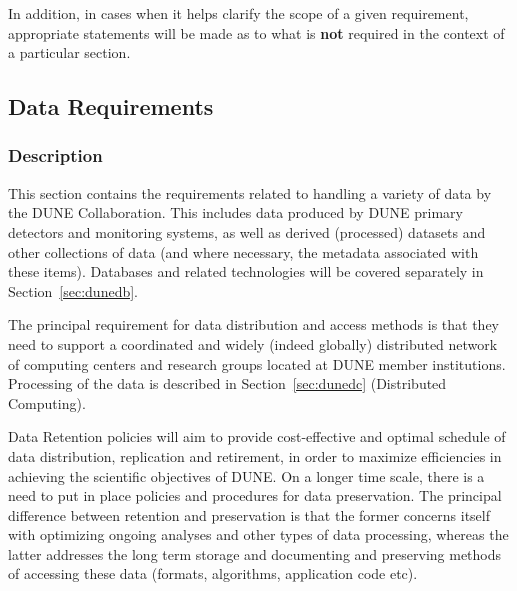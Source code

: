 In addition, in cases when it helps clarify the scope of a given  requirement, appropriate statements will be made as to what is \textbf{not} required in the context of a particular section.


\subsection{Data Requirements}
\label{sec:dunedata}

\subsubsection{Description}
This section contains the requirements related to handling a variety of data by the DUNE Collaboration. This includes data produced by DUNE primary detectors and monitoring systems, as well as derived (processed) datasets and other collections of data (and where necessary, the metadata associated with these items). Databases and related technologies will be covered separately in Section~\ref{sec:dunedb}.

The principal requirement for data distribution and access methods is that they need to support a coordinated and widely (indeed globally) distributed network of computing centers and research groups located at DUNE member institutions. Processing of the data is described in Section~\ref{sec:dunedc} (Distributed Computing).

Data Retention policies will aim to provide cost-effective and optimal schedule of data distribution, replication and retirement, in order to maximize
efficiencies in achieving the scientific objectives of DUNE. On a longer time scale, there is a need to put in place policies and procedures for data preservation.
The principal difference between retention and preservation is that the former concerns itself with optimizing ongoing analyses and other types of data processing,
whereas the latter addresses the long term storage and documenting and preserving methods of accessing these data (formats, algorithms, application code etc).


